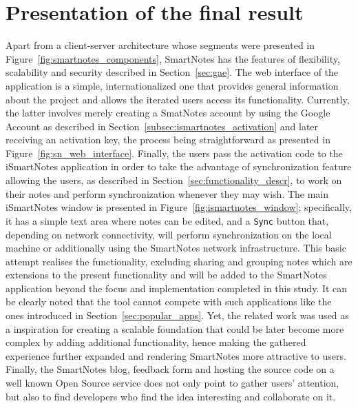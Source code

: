 \section{Presentation of the final result}\label{sec:result}
Apart from a client-server architecture whose segments were presented in Figure~\ref{fig:smartnotes_components}, SmartNotes has the features of flexibility, scalability and security described in Section~\ref{sec:gae}. The web interface of the application is a simple, internationalized one that provides general information about the project and allows the iterated users access its functionality. Currently, the latter involves merely creating a SmatNotes account by using the Google Account as described in Section~\ref{subsec:ismartnotes_activation} and later receiving an activation key, the process being straightforward as presented in Figure~\ref{fig:sn_web_interface}. Finally, the users pass the activation code to the iSmartNotes application in order to take the advantage of synchronization feature allowing the users, as described in Section~\ref{sec:functionality_descr}, to work on their notes and perform synchronization whenever they may wish. The main iSmartNotes window is presented in Figure~\ref{fig:ismartnotes_window}; specifically, it has a simple text area where notes can be edited, and a \texttt{Sync} button that, depending on network connectivity, will perform synchronization on the local machine or additionally using the SmartNotes network infrastructure. This basic attempt realises the functionality, excluding sharing and grouping notes which are extensions to the present functionality and will be added to the SmartNotes application beyond the focus and implementation completed in this study. It can be clearly noted that the tool cannot compete with such applications like the ones introduced in Section~\ref{sec:popular_apps}. Yet, the related work was used as a inspiration for creating a scalable foundation that could be later become more complex by adding additional functionality, hence making the gathered experience further expanded and rendering SmartNotes more attractive to users. Finally, the SmartNotes blog, feedback form and hosting the source code on a well known Open Source service does not only point to gather users’ attention, but also to find developers who find the idea interesting and collaborate on it.
 
